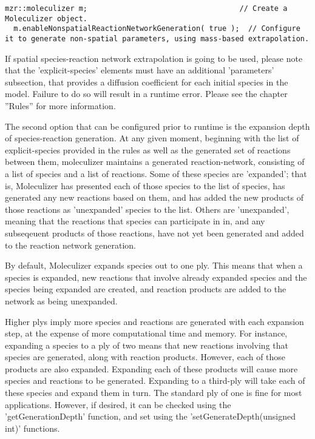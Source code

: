 \begin{lstlisting}[caption=Enabling non-spatial reaction generation]
  mzr::moleculizer m;                                   // Create a Moleculizer object.
  m.enableNonspatialReactionNetworkGeneration( true );  // Configure it to generate non-spatial parameters, using mass-based extrapolation.
\end{lstlisting}

If spatial species-reaction network extrapolation is going to be used,
please note that the 'explicit-species' elements must have an
additional 'parameters' subsection, that provides a diffusion
coefficient for each initial species in the model.  Failure to do so
will result in a runtime error.  Please see the chapter ''Rules'' for
more information.

The second option that can be configured prior to runtime is the
expansion depth of species-reaction generation.  At any given moment,
beginning with the list of explicit-species provided in the rules as
well as the generated set of reactions between them, moleculizer
maintains a generated reaction-network, consisting of a list of
species and a list of reactions.  Some of these species are
'expanded'; that is, Moleculizer has presented each of those species
to the list of species, has generated any new reactions based on them,
and has added the new products of those reactions as 'unexpanded'
species to the list.  Others are 'unexpanded', meaning that the
reactions that species can participate in in, and any subseqeuent
products of those reactions, have not yet been generated and added to
the reaction network generation.  

By default, Moleculizer expands species out to one ply.  This means
that when a species is expanded, new reactions that involve already
expanded species and the species being expanded are created, and
reaction products are added to the network as being unexpanded.  

Higher plys imply more species and reactions are generated with each
expansion step, at the expense of more computational time and memory.
For instance, expanding a species to a ply of two means that new
reactions involving that species are generated, along with reaction
products.  However, each of those products are also expanded.
Expanding each of these products will cause more species and reactions
to be generated.  Expanding to a third-ply will take each of these
species and expand them in turn.  The standard ply of one is fine for
most applications.  However, if desired, it can be checked using the
'getGenerationDepth' function, and set using the
'setGenerateDepth(unsigned int)' functions.  

